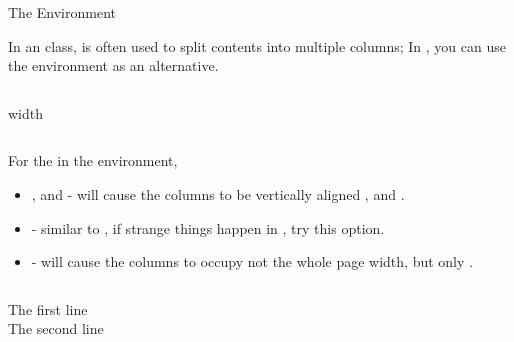 \begin{fragileframe}{The  Environment}

In an  class,  is often used to split contents into multiple columns; In , you can use the  environment as an alternative. 

\begin{command}
\begin{LCL}
\begin{columns}[options]
  \begin{column}[placement]{width}
  \end{column}
\end{columns} 
\end{LCL}
\end{command}

For the  in the  environment,

\begin{itemize}
\item {},  and  -  will cause the columns to be vertically aligned ,  and .
\item {} - similar to , if strange things happen in , try this option.
\item {} -  will cause the columns to occupy not the whole page width, but only .
\end{itemize}\medskip

\end{fragileframe}

\begin{fragileframe}

\begin{latexexample}
\begin{columns}[c]
  \begin{column}{0.5\textwidth}
    \begin{center}
      The first line \\
      The second line
    \end{center}
  \end{column}
\end{columns} 
\end{latexexample}

\end{fragileframe}

